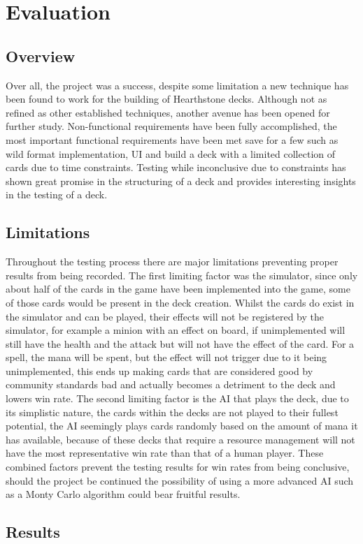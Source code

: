 \documentclass{report} %
\begin{document}
\chapter{Evaluation}
\section{Overview}
Over all, the project was a success, despite some limitation a new technique has been found to work for the building of Hearthstone decks. Although not as refined as other established techniques, another avenue has been opened for further study. Non-functional requirements have been fully accomplished, the most important functional requirements have been met save for a few such as wild format implementation, UI and build a deck with a limited collection of cards due to time constraints. Testing while inconclusive due to constraints has shown great promise in the structuring of a deck and provides interesting insights in the testing of a deck.
\section{Limitations}
Throughout the testing process there are major limitations preventing proper results from being recorded. The first limiting factor was the simulator, since only about half of the cards in the game have been implemented into the game, some of those cards would be present in the deck creation. Whilst the cards do exist in the simulator and can be played, their effects will not be registered by the simulator, for example a minion with an effect on board, if unimplemented will still have the health and the attack but will not have the effect of the card. For a spell, the mana will be spent, but the effect will not trigger due to it being unimplemented, this ends up making cards that are considered good by community standards bad and actually becomes a detriment to the deck and lowers win rate. The second limiting factor is the AI that plays the deck, due to its simplistic nature, the cards within the decks are not played to their fullest potential, the AI seemingly plays cards randomly based on the amount of mana it has available, because of these decks that require a resource management will not have the most representative win rate than that of a human player. These combined factors prevent the testing results for win rates from being conclusive, should the project be continued the possibility of using a more advanced AI such as a Monty Carlo algorithm could bear fruitful results.
\section{Results}
\end{document}
